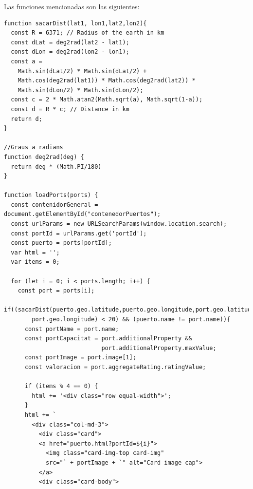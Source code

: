 \documentclass{article}
\begin{document}
\begin{itemize}
    Las funciones mencionadas son las siguientes:
    \begin{verbatim}
function sacarDist(lat1, lon1,lat2,lon2){
  const R = 6371; // Radius of the earth in km
  const dLat = deg2rad(lat2 - lat1);
  const dLon = deg2rad(lon2 - lon1); 
  const a = 
    Math.sin(dLat/2) * Math.sin(dLat/2) +
    Math.cos(deg2rad(lat1)) * Math.cos(deg2rad(lat2)) * 
    Math.sin(dLon/2) * Math.sin(dLon/2); 
  const c = 2 * Math.atan2(Math.sqrt(a), Math.sqrt(1-a)); 
  const d = R * c; // Distance in km
  return d;
}

//Graus a radians
function deg2rad(deg) {
  return deg * (Math.PI/180)
}

function loadPorts(ports) {
  const contenidorGeneral = document.getElementById("contenedorPuertos");
  const urlParams = new URLSearchParams(window.location.search);
  const portId = urlParams.get('portId');
  const puerto = ports[portId];
  var html = '';
  var items = 0;

  for (let i = 0; i < ports.length; i++) {
    const port = ports[i];
    if((sacarDist(puerto.geo.latitude,puerto.geo.longitude,port.geo.latitude,
        port.geo.longitude) < 20) && (puerto.name != port.name)){
      const portName = port.name;
      const portCapacitat = port.additionalProperty && 
                            port.additionalProperty.maxValue;
      const portImage = port.image[1];
      const valoracion = port.aggregateRating.ratingValue;

      if (items % 4 == 0) {
        html += '<div class="row equal-width">';
      }
      html += `
        <div class="col-md-3">
          <div class="card">
          <a href="puerto.html?portId=${i}">
            <img class="card-img-top card-img" 
            src="` + portImage + `" alt="Card image cap">
          </a>
          <div class="card-body"> 
           

\end{verbatim}
\end{itemize}
\end{document}
